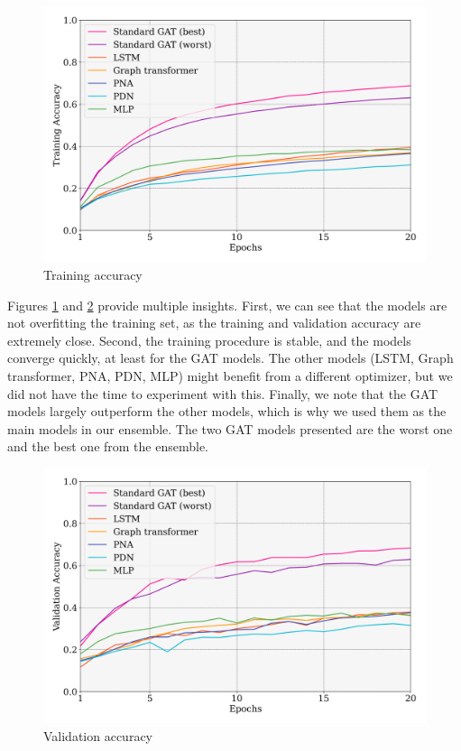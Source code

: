 \documentclass[switch, 11pt]{article}
\begin{document}
\begin{multicols}{2}
    \begin{figure}[H]
        \centering
        \includegraphics[width=\columnwidth]{figures/train_accuracy.png}
        \caption{Training accuracy}
        \label{fig:train_accuracy}
    \end{figure}

    Figures \ref{fig:train_accuracy} and \ref{fig:val_accuracy} provide multiple insights. First, we can see that the models are not overfitting the training set, as the training and validation accuracy are extremely close. Second, the training procedure is stable, and the models converge quickly, at least for the GAT models. The other models (LSTM, Graph transformer, PNA, PDN, MLP) might benefit from a different optimizer, but we did not have the time to experiment with this. Finally, we note that the GAT models largely outperform the other models, which is why we used them as the main models in our ensemble. The two GAT models presented are the worst one and the best one from the ensemble.

    \begin{figure}[H]
        \centering
        \includegraphics[width=\columnwidth]{figures/val_accuracy.png}
        \caption{Validation accuracy}
        \label{fig:val_accuracy}
    \end{figure}


\end{multicols}
\end{document}

